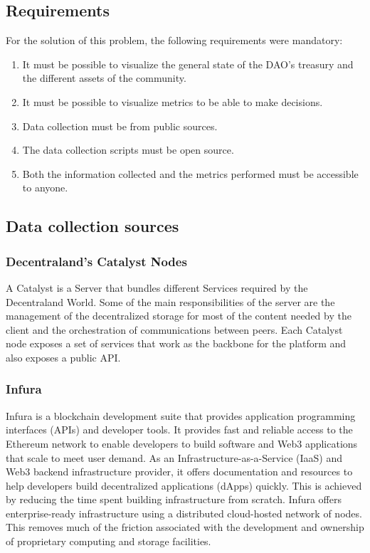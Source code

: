 \documentclass[MSE,Master,english]{twbook}%
\begin{document}
\subsection{Requirements}
For the solution of this problem, the following requirements were mandatory:
\begin{enumerate}
  \item It must be possible to visualize the general state of the DAO's treasury and the different assets of the community.
  \item It must be possible to visualize metrics to be able to make decisions.
  \item Data collection must be from public sources.
  \item The data collection scripts must be open source.
  \item Both the information collected and the metrics performed must be accessible to anyone.
\end{enumerate}

\subsection{Data collection sources}
\subsubsection{Decentraland's Catalyst Nodes}
A Catalyst\cite{catalyst} is a Server that bundles different Services required by the Decentraland World. Some of the main responsibilities of the server are the management of the decentralized storage for most of the content needed by the client and the orchestration of communications between peers. Each Catalyst node exposes a set of services that work as the backbone for the platform and also exposes a public API.\cite{catalyst2}


\subsubsection{Infura}
Infura\cite{infura} is a blockchain development suite that provides application programming interfaces (APIs) and developer tools. It provides fast and reliable access to the Ethereum network to enable developers to build software and Web3 applications that scale to meet user demand.
As an Infrastructure-as-a-Service (IaaS) and Web3 backend infrastructure provider, it offers documentation and resources to help developers build decentralized applications (dApps) quickly. This is achieved by reducing the time spent building infrastructure from scratch. Infura offers enterprise-ready infrastructure using a distributed cloud-hosted network of nodes. This removes much of the friction associated with the development and ownership of proprietary computing and storage facilities.\cite{infura}
\end{document}
